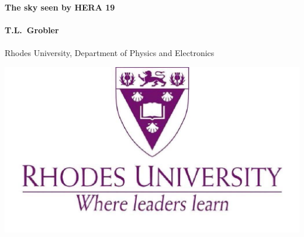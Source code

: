 \documentclass[a0,portrait]{a0poster}
\begin{document}


\begin{minipage}[b]{0.75\linewidth}
\veryHuge \color{NavyBlue} \textbf{The sky seen by HERA 19} \color{Black}\\ %
\\
\huge \textbf{T.L.~Grobler}\\[0.5cm] %
\\
\huge Rhodes University, Department of Physics and Electronics\\[0.4cm] %
\end{minipage}
%
\begin{minipage}[b]{0.25\linewidth}
\includegraphics[width=20cm]{Rhodes_logo.jpg}\\
\end{minipage}

\vspace{1cm} %
\end{document}
